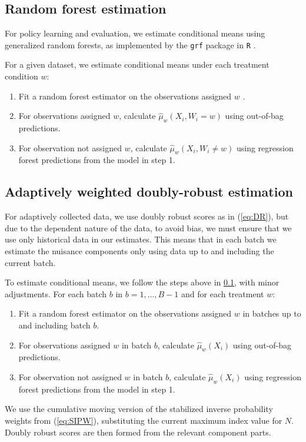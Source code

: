 \documentclass[letterpaper, 12pt, parskip=full,]{scrartcl}
\begin{document}
\subsection{Random forest estimation}\label{appendix:grf}
For policy learning and evaluation, we estimate conditional means using generalized random forests, as implemented by the \texttt{grf} package in \texttt{R} \citep{Tibshirani:2020aa}. 

For a given dataset, we estimate conditional means under each treatment condition $w$:
\begin{enumerate}
\item Fit a random forest estimator on the observations assigned $w$ . 
\item For observations assigned $w$, calculate $\hat\mu_w(X_i, W_i = w)$ using out-of-bag predictions. 
\item For observation not assigned $w$, calculate $\hat\mu_w(X_i, W_i \neq w)$ using regression forest predictions from the model in step 1. 
\end{enumerate}

\subsection{Adaptively weighted doubly-robust estimation} \label{appendix:DRlfo}
For adaptively collected data, we use doubly robust scores as in (\ref{eq:DR}), but due to the dependent nature of the data, to avoid bias, we must ensure that we use only historical data in our estimates. This means that in each batch we estimate the nuisance components only using data up to and including the current batch. 

To estimate conditional means, we follow the steps above in \ref{appendix:grf}, with minor adjustments. For each batch $b$ in $b = 1, \dots, B-1$ and for each treatment $w$:
\begin{enumerate}
\item Fit a random forest estimator on the observations assigned $w$ in batches up to and including batch $b$. 
\item For observations assigned $w$ in batch $b$, calculate $\hat\mu_w(X_i)$ using out-of-bag predictions. 
\item For observation not assigned $w$ in batch $b$, calculate $\hat\mu_w(X_i)$ using regression forest predictions from the model in step 1. 
\end{enumerate}

We use the cumulative moving version of the stabilized inverse probability weights from (\ref{eq:SIPW}), substituting the current maximum index value for $N$. 
Doubly robust scores are then formed from the relevant component parts. 
\end{document}

